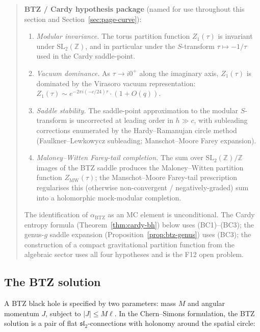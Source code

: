 \documentclass[11pt,reqno]{amsart}
\theoremstyle{definition}
\theoremstyle{remark}
\begin{document}
\begin{quote}
\textbf{BTZ / Cardy hypothesis package} (named for use throughout
this section and Section~\ref{sec:page-curve}):
\begin{enumerate}[label=\textup{(BC\arabic*)}]
\item \emph{Modular invariance.} The torus partition function
  $Z_1(\tau)$ is invariant under $\mathrm{SL}_2(\mathbb{Z})$, and in
  particular under the $S$-transform $\tau \mapsto -1/\tau$ used in
  the Cardy saddle-point.
\item \emph{Vacuum dominance.} As $\tau \to i 0^+$ along the
  imaginary axis, $Z_1(\tau)$ is dominated by the Virasoro vacuum
  representation: $Z_1(\tau) \sim e^{-2\pi i (-c/24)\tau} \cdot (1 +
  O(q))$.
\item \emph{Saddle stability.} The saddle-point approximation to
  the modular $S$-transform is uncorrected at leading order in
  $h \gg c$, with subleading corrections enumerated by the
  Hardy--Ramanujan circle method (Faulkner--Lewkowycz subleading;
  Manschot--Moore Farey expansion).
\item \emph{Maloney--Witten Farey-tail completion.} The sum over
  $\mathrm{SL}_2(\mathbb{Z})/\mathbb{Z}$ images of the BTZ saddle
  produces the Maloney--Witten partition function
  $Z_{\mathrm{MW}}(\tau)$; the Manschot--Moore Farey-tail
  prescription regularises this (otherwise non-convergent /
  negatively-graded) sum into a holomorphic mock-modular
  completion.
\end{enumerate}
The identification of $\alpha_{\mathrm{BTZ}}$ as an MC element is
unconditional. The Cardy entropy formula
(Theorem~\ref{thm:cardy-bh}) below uses (BC1)--(BC3); the
genus-$g$ saddle expansion (Proposition~\ref{prop:btz-genus}) uses
(BC3); the construction of a compact gravitational partition
function from the algebraic sector uses all four hypotheses and is
the F12 open problem.
\end{quote}

\subsection{The BTZ solution}

A BTZ black hole is specified by two parameters: mass $M$ and
angular momentum $J$, subject to $|J| \le M\ell$.
In the Chern--Simons formulation, the BTZ solution is a pair of
flat $\mathfrak{sl}_2$-connections with holonomy around the
spatial circle:
\end{document}
